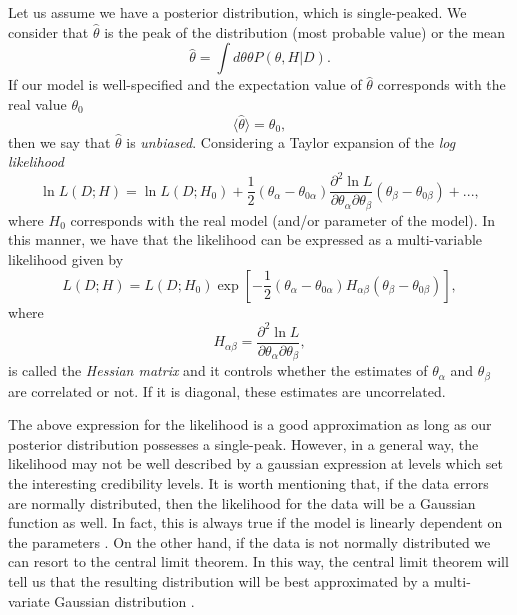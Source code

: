 \documentclass[onecolumn,           %
               showpacs,            %
               preprintnumbers,     %
               aps,                 %
               prl,          	    %
               letterpaper,             %
               superscriptaddress,      %
               nofootinbib,         %
               tightenlines,        %
               floats,floatfix      %
               ,usenatbib,
               ]{revtex4-1}
\begin{document}
Let us assume we have a posterior distribution, which is single-peaked. We consider that $\hat \theta$ is the peak of the distribution (most probable value) or the mean
\begin{equation}
\hat \theta =\int d\theta \theta P(\theta,H|D).
\end{equation}
If our model is well-specified and the expectation value of $\hat \theta$ corresponds with the real value $\theta_0$
\begin{equation}
\langle\hat \theta\rangle=\theta_0,
\end{equation}
then we say that $\hat \theta$ is \textit{unbiased}. Considering a Taylor expansion of the \textit{log likelihood}
\begin{equation}
\ln L(D;H)=\ln L(D;H_0)+\frac{1}{2}(\theta_\alpha-\theta_{0\alpha})\frac{\partial^2\ln L}{\partial\theta_\alpha \partial\theta_\beta}(\theta_\beta-\theta_{0\beta})+...,
\end{equation}
where $H_0$ corresponds with the real model (and/or parameter of the model). In this manner, we have that the likelihood can be expressed as a multi-variable likelihood given by 
\begin{equation}\label{GLik}
L(D;H)=L(D;H_0)\exp \left[-\frac{1}{2}(\theta_\alpha-\theta_{0\alpha})H_{\alpha\beta}(\theta_\beta-\theta_{0\beta})\right],
\end{equation}
where 
\begin{equation}
H_{\alpha\beta}=\frac{\partial^2\ln L}{\partial\theta_\alpha \partial\theta_\beta},
\end{equation}
is called the \textit{Hessian matrix} and it controls whether the estimates of $\theta_\alpha$ and $\theta_\beta$ are correlated or not. If it is diagonal, these estimates are uncorrelated.

The above expression for the likelihood is a good approximation as long as our posterior distribution possesses a single-peak. However, in a general way, the likelihood may not be well described by a gaussian expression at levels which set the interesting credibility levels. It is worth mentioning that, if the data errors are normally distributed, then the likelihood for the data will be a Gaussian function as well.  In fact, this is always true if the model is linearly dependent on the parameters \cite{LiV}. On the other hand, if the data is not normally distributed we can resort to the central limit theorem. In this way, the central limit theorem will tell us that the resulting distribution will be best approximated by a multi-variate Gaussian distribution \cite{LiV}.
\end{document}
